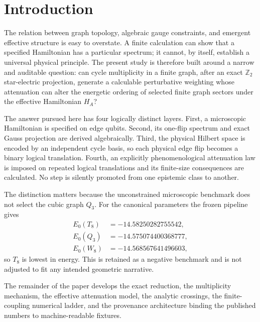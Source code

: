 \documentclass[10pt,twocolumn]{article}
\theoremstyle{definition}
\begin{document}
\section{Introduction}
The relation between graph topology, algebraic gauge constraints, and emergent effective structure is easy to overstate. A finite calculation can show that a specified Hamiltonian has a particular spectrum; it cannot, by itself, establish a universal physical principle. The present study is therefore built around a narrow and auditable question: can cycle multiplicity in a finite graph, after an exact $\mathbb Z_2$ star-electric projection, generate a calculable perturbative weighting whose attenuation can alter the energetic ordering of selected finite graph sectors under the effective Hamiltonian $H_A$?

The answer pursued here has four logically distinct layers. First, a microscopic Hamiltonian is specified on edge qubits. Second, its one-flip spectrum and exact Gauss projection are derived algebraically. Third, the physical Hilbert space is encoded by an independent cycle basis, so each physical edge flip becomes a binary logical translation. Fourth, an explicitly phenomenological attenuation law is imposed on repeated logical translations and its finite-size consequences are calculated. No step is silently promoted from one epistemic class to another.

The distinction matters because the unconstrained microscopic benchmark does not select the cubic graph $Q_3$. For the canonical parameters the frozen pipeline gives
\begin{align*}
E_0(T_8)&=-14.58250282755542,\\
E_0(Q_3)&=-14.575074400368777,\\
E_0(W_8)&=-14.568567641496603,
\end{align*}
so $T_8$ is lowest in energy. This is retained as a negative benchmark and is not adjusted to fit any intended geometric narrative.

The remainder of the paper develops the exact reduction, the multiplicity mechanism, the effective attenuation model, the analytic crossings, the finite-coupling numerical ladder, and the provenance architecture binding the published numbers to machine-readable fixtures.

\end{document}
